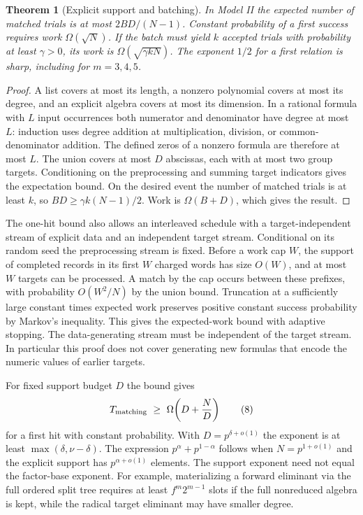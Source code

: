 \documentclass[11pt]{article}
\newtheorem{theorem}{Theorem}
\begin{document}
\begin{theorem}[Explicit support and batching]
In Model II the expected number of matched trials is at most \(2BD/(N-1)\). Constant probability of a first success requires work \(\Omega(\sqrt N)\). If the batch must yield \(k\) accepted trials with probability at least \(\gamma>0\), its work is \(\Omega(\sqrt{\gamma kN})\). The exponent \(1/2\) for a first relation is sharp, including for \(m=3,4,5\).
\end{theorem}
\begin{proof}
A list covers at most its length, a nonzero polynomial covers at most its degree, and an explicit algebra covers at most its dimension. In a rational formula with \(L\) input occurrences both numerator and denominator have degree at most \(L\): induction uses degree addition at multiplication, division, or common-denominator addition. The defined zeros of a nonzero formula are therefore at most \(L\). The union covers at most \(D\) abscissas, each with at most two group targets. Conditioning on the preprocessing and summing target indicators gives the expectation bound. On the desired event the number of matched trials is at least \(k\), so \(BD\ge\gamma k(N-1)/2\). Work is \(\Omega(B+D)\), which gives the result.
\end{proof}

The one-hit bound also allows an interleaved schedule with a target-independent stream of explicit data and an independent target stream. Conditional on its random seed the preprocessing stream is fixed. Before a work cap \(W\), the support of completed records in its first \(W\) charged words has size \(O(W)\), and at most \(W\) targets can be processed. A match by the cap occurs between these prefixes, with probability \(O(W^2/N)\) by the union bound. Truncation at a sufficiently large constant times expected work preserves positive constant success probability by Markov's inequality. This gives the expected-work bound with adaptive stopping. The data-generating stream must be independent of the target stream. In particular this proof does not cover generating new formulas that encode the numeric values of earlier targets.

For fixed support budget \(D\) the bound gives
\[
  T_{\rm matching}\ \ge\ \Omega\!\left(D+\frac{N}{D}\right)
\tag{8}
\]
for a first hit with constant probability. With \(D=p^{\delta+o(1)}\) the exponent is at least \(\max(\delta,\nu-\delta)\). The expression \(p^\alpha+p^{1-\alpha}\) follows when \(N=p^{1+o(1)}\) and the explicit support has \(p^{\alpha+o(1)}\) elements. The support exponent need not equal the factor-base exponent. For example, materializing a forward eliminant via the full ordered split tree requires at least \(f^m2^{m-1}\) slots if the full nonreduced algebra is kept, while the radical target eliminant may have smaller degree.
\end{document}
